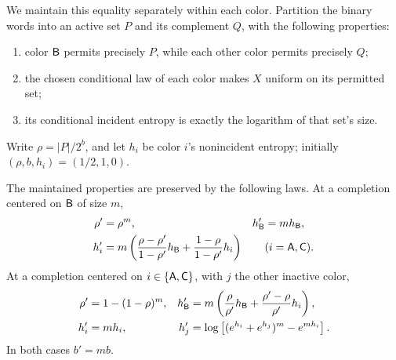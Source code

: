 We maintain this equality separately within each color.
Partition the binary words into an active set \(P\) and its complement
\(Q\), with the following properties:
\begin{enumerate}
 \item color \(\mathsf B\) permits precisely \(P\), while each other color
 permits precisely \(Q\);
 \item the chosen conditional law of each color makes \(X\) uniform on
 its permitted set;
 \item its conditional incident entropy is exactly the logarithm of
 that set's size.
\end{enumerate}
Write \(\rho=|P|/2^b\), and let \(h_i\) be color \(i\)'s nonincident
entropy; initially \((\rho,b,h_i)=(1/2,1,0)\).

\begin{lemma}\label{lem:uniform-update}
The maintained properties are preserved by the following laws.
At a completion centered on \(\mathsf B\) of size \(m\),
\begin{align}
 \rho'&=\rho^m,& h'_{\mathsf B}&=m h_{\mathsf B}, \label{eq:minus-rho}\\
 h'_i&=
 m\left(\frac{\rho-\rho'}{1-\rho'}h_{\mathsf B}
         +\frac{1-\rho}{1-\rho'}h_i\right)
       &&(i=\mathsf A,\mathsf C). \label{eq:minus-h}
\end{align}
At a completion centered on \(i\in\{\mathsf A,\mathsf C\}\), with \(j\) the
other inactive color,
\begin{align}
 \rho'&=1-(1-\rho)^m,&
 h'_{\mathsf B}&=
 m\left(\frac{\rho}{\rho'}h_{\mathsf B}
       +\frac{\rho'-\rho}{\rho'}h_i\right), \label{eq:plus-rho}\\
 h'_i&=mh_i,&
 h'_j&=\log\left[(e^{h_i}+e^{h_j})^m-e^{mh_i}\right].
 \label{eq:plus-h}
\end{align}
In both cases \(b'=mb\).
\end{lemma}

